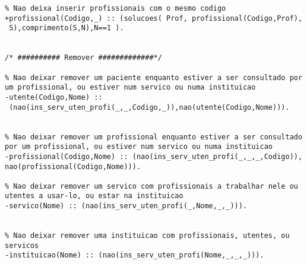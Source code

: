 \documentclass[pdftex,12pt,a4paper]{report}
\begin{document}
\begin{appendices}
\begin{Verbatim}
% Nao deixa inserir profissionais com o mesmo codigo
+profissional(Codigo,_) :: (solucoes( Prof, profissional(Codigo,Prof),
 S),comprimento(S,N),N==1 ).


/* ########## Remover #############*/

% Nao deixar remover um paciente enquanto estiver a ser consultado por um profissional, ou estiver num servico ou numa instituicao
-utente(Codigo,Nome) ::
 (nao(ins_serv_uten_profi(_,_,Codigo,_)),nao(utente(Codigo,Nome))).


% Nao deixar remover um profissional enquanto estiver a ser consultado por um profissional, ou estiver num servico ou numa instituicao
-profissional(Codigo,Nome) :: (nao(ins_serv_uten_profi(_,_,_,Codigo)),
nao(profissional(Codigo,Nome))).

% Nao deixar remover um servico com profissionais a trabalhar nele ou utentes a usar-lo, ou estar na instituicao
-servico(Nome) :: (nao(ins_serv_uten_profi(_,Nome,_,_))).


% Nao deixar remover uma instituicao com profissionais, utentes, ou servicos
-instituicao(Nome) :: (nao(ins_serv_uten_profi(Nome,_,_,_))).

\end{Verbatim}
\end{appendices}
\end{document}
